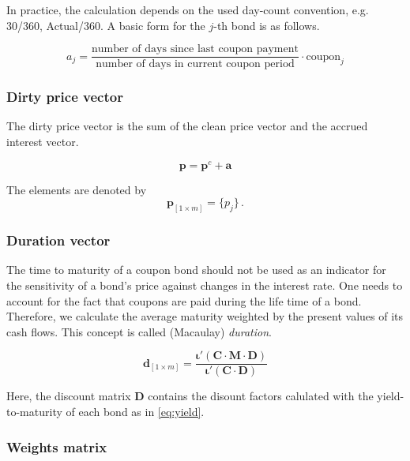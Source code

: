 In practice, the calculation depends on the used day-count convention, e.g. 30/360, Actual/360. A basic form for the $j$-th bond is as follows.

\begin{equation}
    a_j= \frac{\mbox{number of days since last coupon payment}}{\mbox{number of days in current coupon period}}\cdot \mbox{coupon}_j
\end{equation}
 	

\subsubsection*{Dirty price vector}

The dirty price vector is the sum of the clean price vector and the accrued interest vector.

\begin{displaymath}
\bm{p}=\bm{p}^c+\bm{a}
\end{displaymath}

The elements are denoted by 
\begin{equation}\label{pd}
    \bm{p}_{\left[1\times m\right]}= \{p_j\}\,.
\end{equation}


\subsubsection*{Duration vector}

The time to maturity of a coupon bond should not be used as an indicator for the sensitivity of a bond's price against changes in the interest rate. One needs to account for the fact that coupons are paid during the life time of a bond. Therefore, we calculate the average maturity weighted by the present values of its cash flows. This concept is called (Macaulay) \emph{duration}.

\begin{equation}
  \label{eq:macaulayduration}
  \bm{d}_{\left[1\times m\right]} = \frac{\bm{\iota}'(\bm{C}\cdot\bm{M}\cdot\bm{D})}{\bm{\iota}'(\bm{C}\cdot\bm{D})}
\end{equation}

Here, the discount matrix $\bm{D}$ contains the disount factors calulated with the yield-to-maturity of each bond as in \eqref{eq:yield}.

\subsubsection*{Weights matrix}

